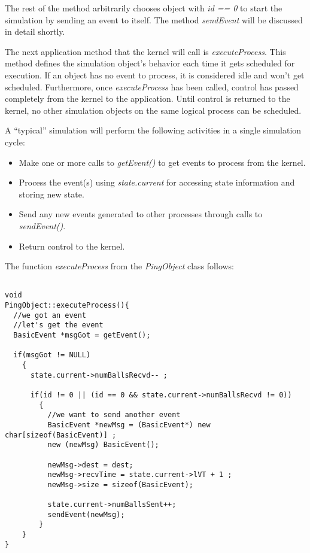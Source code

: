 \documentclass[11pt]{report}
\begin{document}
The rest of the method arbitrarily chooses object with {\it id == 0} to
start the simulation by sending an event to itself.  The method
{\it sendEvent} will be discussed in detail shortly.

The next application method that the kernel will call is
{\it executeProcess}.  This method defines the simulation object's
behavior each time it gets scheduled for execution.  If an object has no
event to process, it is considered idle and won't get scheduled.
Furthermore, once {\it executeProcess} has been called, control has
passed completely from the kernel to the application.  Until control is
returned to the kernel, no other simulation objects on the same logical
process can be scheduled.

A ``typical'' simulation will perform the following activities in a
single simulation cycle:

\begin{itemize}
\item 
Make one or more calls to {\it getEvent()} to get events to process
from the kernel.
\item
Process the event(s) using {\it state.current} for accessing state
information and storing new state.
\item 
Send any new events generated to other processes through calls to
{\it sendEvent()}.
\item
Return control to the kernel.
\end{itemize}

The function {\it executeProcess} from the {\it PingObject} class
follows:

\begin{verbatim} 

void 
PingObject::executeProcess(){
  //we got an event
  //let's get the event
  BasicEvent *msgGot = getEvent();
  
  if(msgGot != NULL)
    {
      state.current->numBallsRecvd-- ;
      
      if(id != 0 || (id == 0 && state.current->numBallsRecvd != 0))
        {
          //we want to send another event
          BasicEvent *newMsg = (BasicEvent*) new char[sizeof(BasicEvent)] ;
          new (newMsg) BasicEvent();
          
          newMsg->dest = dest;
          newMsg->recvTime = state.current->lVT + 1 ;
          newMsg->size = sizeof(BasicEvent);
      
          state.current->numBallsSent++;
          sendEvent(newMsg);
        }
    }   
}
\end{verbatim}
\end{document}
